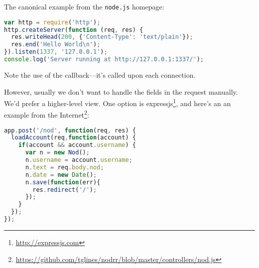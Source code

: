 \documentclass[11pt]{article}
\begin{document}
The canonical example from the {\tt node.js} homepage:
\begin{lstlisting}[language=JavaScript]
var http = require('http');
http.createServer(function (req, res) {
  res.writeHead(200, {'Content-Type': 'text/plain'});
  res.end('Hello World\n');
}).listen(1337, '127.0.0.1');
console.log('Server running at http://127.0.0.1:1337/');
\end{lstlisting}

Note the use of the callback---it's called upon each connection.

However, usually we don't want to handle the fields in the request manually.
We'd prefer a higher-level view. One option is expressjs\footnote{\url{http://expressjs.com}},
and here's an an example from the Internet\footnote{\tiny \url{https://github.com/tglines/nodrr/blob/master/controllers/nod.js}}:
\begin{lstlisting}[language=JavaScript]
app.post('/nod', function(req, res) {
  loadAccount(req,function(account) {
    if(account && account.username) {
      var n = new Nod();
      n.username = account.username;
      n.text = req.body.nod;
      n.date = new Date();
      n.save(function(err){
        res.redirect('/');
      });
    }
  });
});
\end{lstlisting}
\end{document}
